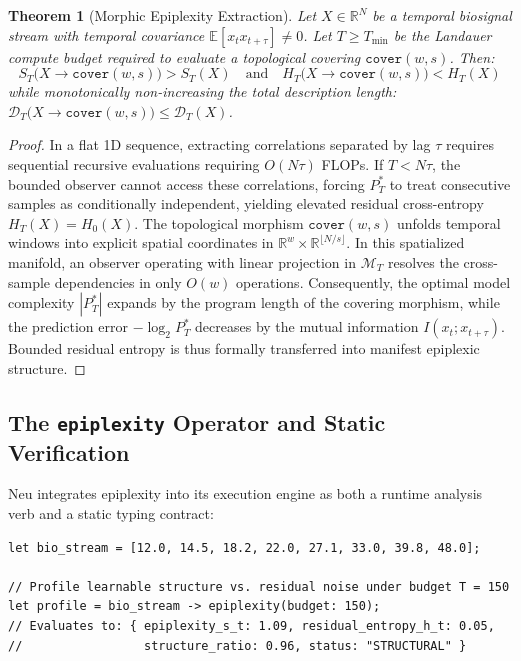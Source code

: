\documentclass[11pt]{article}
\newtheorem{theorem}{Theorem}
\begin{document}
\begin{theorem}[Morphic Epiplexity Extraction]
\label{thm:epiplexity_extraction}
Let $X \in \mathbb{R}^N$ be a temporal biosignal stream with temporal covariance $\mathbb{E}[x_t x_{t+\tau}] \ne 0$. Let $T \ge T_{\min}$ be the Landauer compute budget required to evaluate a topological covering $\texttt{cover}(w, s)$. Then:
\begin{equation}
S_T\big(X \to \texttt{cover}(w, s)\big) > S_T(X) \quad \text{and} \quad H_T\big(X \to \texttt{cover}(w, s)\big) < H_T(X)
\end{equation}
while monotonically non-increasing the total description length: $\mathcal{D}_T\big(X \to \texttt{cover}(w, s)\big) \le \mathcal{D}_T(X)$.
\end{theorem}
\begin{proof}
In a flat 1D sequence, extracting correlations separated by lag $\tau$ requires sequential recursive evaluations requiring $O(N \tau)$ FLOPs. If $T < N\tau$, the bounded observer cannot access these correlations, forcing $P_T^*$ to treat consecutive samples as conditionally independent, yielding elevated residual cross-entropy $H_T(X) = H_0(X)$. The topological morphism $\texttt{cover}(w, s)$ unfolds temporal windows into explicit spatial coordinates in $\mathbb{R}^w \times \mathbb{R}^{\lfloor N/s \rfloor}$. In this spatialized manifold, an observer operating with linear projection in $\mathcal{M}_T$ resolves the cross-sample dependencies in only $O(w)$ operations. Consequently, the optimal model complexity $|P_T^*|$ expands by the program length of the covering morphism, while the prediction error $-\log_2 P_T^*$ decreases by the mutual information $I(x_t; x_{t+\tau})$. Bounded residual entropy is thus formally transferred into manifest epiplexic structure.
\end{proof}

\subsection{The \texttt{epiplexity} Operator and Static Verification}
Neu integrates epiplexity into its execution engine as both a runtime analysis verb and a static typing contract:
\begin{lstlisting}[language=neu]
let bio_stream = [12.0, 14.5, 18.2, 22.0, 27.1, 33.0, 39.8, 48.0];

// Profile learnable structure vs. residual noise under budget T = 150
let profile = bio_stream -> epiplexity(budget: 150);
// Evaluates to: { epiplexity_s_t: 1.09, residual_entropy_h_t: 0.05, 
//                 structure_ratio: 0.96, status: "STRUCTURAL" }
\end{lstlisting}
\end{document}
